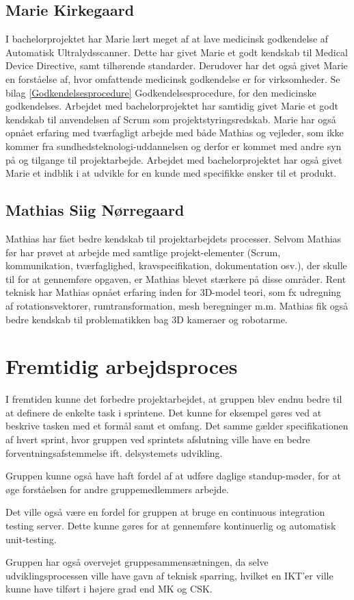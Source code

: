 \subsection{Marie Kirkegaard}
I bachelorprojektet har Marie lært meget af at lave medicinsk godkendelse af Automatisk Ultralydsscanner. Dette har givet Marie et godt kendskab til Medical Device Directive, samt tilhørende standarder. Derudover har det også givet Marie en forståelse af, hvor omfattende medicinsk godkendelse er for virksomheder. Se bilag \ref{Godkendelsesprocedure} Godkendelsesprocedure, for den medicinske godkendelses. Arbejdet med bachelorprojektet har samtidig givet Marie et godt kendskab til anvendelsen af Scrum som projektstyringsredskab. Marie har også opnået erfaring med tværfagligt arbejde med både Mathias og vejleder, som ikke kommer fra sundhedsteknologi-uddannelsen og derfor er kommet med andre syn på og tilgange til projektarbejde. Arbejdet med bachelorprojektet har også givet Marie et indblik i at udvikle for en kunde med specifikke ønsker til et produkt. 

\subsection{Mathias Siig Nørregaard}
Mathias har fået bedre kendskab til projektarbejdets processer. Selvom Mathias før har prøvet at arbejde med samtlige projekt-elementer (Scrum, kommunikation, tværfaglighed, kravspecifikation, dokumentation osv.), der skulle til for at gennemføre opgaven, er Mathias blevet stærkere på disse områder. Rent teknisk har Mathias opnået erfaring inden for 3D-model teori, som fx udregning af rotationsvektorer, rumtransformation, mesh beregninger m.m. Mathias fik også bedre kendskab til problematikken bag 3D kameraer og robotarme.

\section{Fremtidig arbejdsproces}
I fremtiden kunne det forbedre projektarbejdet, at gruppen blev endnu bedre til at definere de enkelte task i sprintene. Det kunne for eksempel gøres ved at beskrive tasken med et formål samt et omfang. Det samme gælder specifikationen af hvert sprint, hvor gruppen ved sprintets afslutning ville have en bedre forventningsafstemmelse ift. delsystemets udvikling.

Gruppen kunne også have haft fordel af at udføre daglige standup-møder, for at øge forståelsen for andre gruppemedlemmers arbejde.

Det ville også være en fordel for gruppen at bruge en continuous integration testing server. Dette kunne gøres for at gennemføre kontinuerlig og automatisk unit-testing.

Gruppen har også overvejet gruppesammensætningen, da selve udviklingsprocessen ville have gavn af teknisk sparring, hvilket en IKT'er ville kunne have tilført i højere grad end MK og CSK.